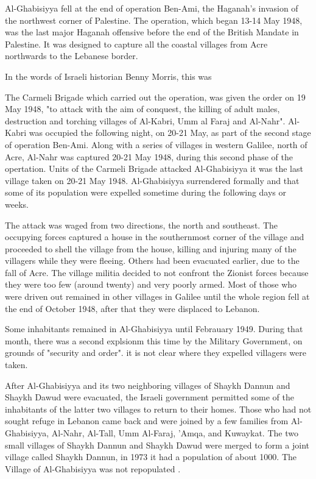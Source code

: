 Al-Ghabisiyya fell at the end of operation Ben-Ami, the Haganah's invasion of the northwest corner of Palestine. The operation, which began 13-14 May 1948, was the last major Haganah offensive before the end of the British Mandate in Palestine. It was designed to capture all the coastal villages from Acre northwards to the Lebanese border\citep{Khalidi2015}.

In the words of Israeli historian Benny Morris, this was \cite[p.252]{Morris2004}

The Carmeli Brigade which carried out the operation, was given the order on 19 May 1948, "to attack with the aim of conquest, the killing of adult males, destruction and torching villages of Al-Kabri, Umm al Faraj and Al-Nahr"\cite[p.253]{Morris2004}. Al-Kabri was occupied the following night, on 20-21 May, as part of the second stage of operation Ben-Ami. Along with a series of villages in western Galilee, north of Acre, Al-Nahr was captured 20-21 May 1948, during this second phase of the opertation. Units of the Carmeli Brigade attacked Al-Ghabisiyya it was the last village taken on 20-21 May 1948. Al-Ghabisiyya surrendered formally and that some of its population were expelled sometime during the following days or weeks\citep{Morris2004}.

The attack was waged from two directions, the north and southeast. The occupying forces captured a house in the southernmost corner of the village and proceeded to shell the village from the house, killing and injuring many of the villagers while they were fleeing. Others had been evacuated earlier, due to the fall of Acre. The village militia decided to not confront the Zionist forces because they were too few (around twenty) and very poorly armed. Most of those who were driven out remained in other villages in Galilee until the whole region fell at the end of October 1948, after that they were displaced to Lebanon\citep{Khalidi2015}.

Some inhabitants remained in Al-Ghabisiyya until Febrauary 1949. During that month, there was a second explsionm this time by the Military Government, on grounds of "security and order". it is not clear where they expelled villagers were taken\citep{Morris2004}.

After Al-Ghabisiyya and its two neighboring villages of Shaykh Dannun and Shaykh Dawud were evacuated, the Israeli government permitted some of the inhabitants of the latter two villages to return to their homes. Those who had not sought refuge in Lebanon came back and were joined by a few families from Al-Ghabisiyya, Al-Nahr, Al-Tall, Umm Al-Faraj, 'Amqa, and Kuwaykat. The two small villages of Shaykh Dannun and Shaykh Dawud were merged to form a joint village called Shaykh Dannun, in 1973 it had a population of about 1000. The Village of Al-Ghabisiyya was not repopulated \cite[p.14-15]{Khalidi2015}.  

